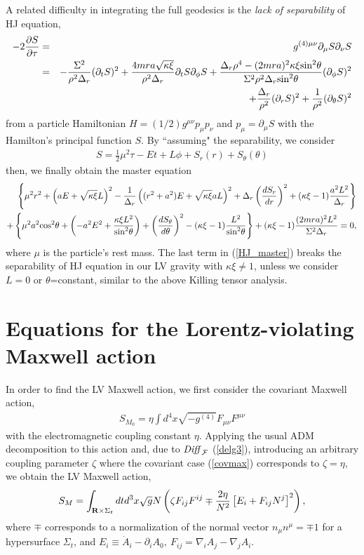 \documentclass[preprint,aps,tightenlines,showkeys,nofootinbib,superscriptaddress]{revtex4}
\newcommand{\beq}{\begin{eqnarray}}
\newcommand{\eeq}{\end{eqnarray}}
\newcommand{\De}{\Delta}
\newcommand{\ka}{\kappa}
\newcommand{\m}{{\mu}}
\newcommand{\n}{{\nu}}
\newcommand{\Si}{{\Sigma}}
\newcommand{\pa}{{\partial}}
\newcommand{\no}{{\nonumber}}
\newcommand{\f}{\frac}
\begin{document}
A related difficulty in integrating the full geodesics is the {\it lack of separability} of HJ equation,
\beq
-2 \f{\pa S}{\pa \tau}&=&g^{(4)\m \n} \pa_{\m}S \pa_{\n}S \no \\
&=&-\f{\Si^2}{\rho^2 \De_r}(\pa_t S)^2+\f{4  mra \sqrt{\ka \xi}}{\rho^2 \De_r}\pa_t S \pa_{\phi}S+\f{\De_r \rho^4 - (2mra)^2  \ka \xi \mbox{sin}^2\theta}{\Si^2 \rho^2 \De_r \mbox{sin}^2\theta}(\pa_{\phi}S)^2 \no \\
&&+\f{\De_r}{\rho^2}(\pa_r S)^2+\f{1}{\rho^2}(\pa_{\theta} S)^2
\label{HJ}
\eeq
from a particle Hamiltonian $H=(1/2)g^{\m\n}p_{\m} p_{\n}$ and $p_{\m}=\pa_{\m}S$ with the Hamilton's principal function $S$. By ``assuming" the separability, we consider \cite{Chan:1985}
\beq
S=\f{1}{2} \m^2 \tau -Et+L \phi+S_r (r)+S_{\theta} (\theta)
\eeq
then, we finally obtain the master equation
\beq
\left\{
\m^2 r^2 +\left(a E+\sqrt{\ka \xi} L \right)^2-\f{1}{\De_r} \left((r^2+a^2)E +\sqrt{\ka \xi} a L \right)^2+\De_r \left( \f{d S_r}{dr}\right)^2
+(\ka\xi-1) \f{a^2 L^2}{\De_r}
\right\} \no \\
+\left\{
\m^2 a^2 \mbox{cos}^2\theta+ \left(-a^2 E^2+\f{\ka \xi L^2}{\mbox{sin}^2\theta} \right)
+\left( \f{d S_{\theta}}{d\theta} \right)^2 -(\ka\xi-1) \f{L^2}{\mbox{sin}^2\theta}
\right\}
+(\ka\xi-1) \f{(2mra)^2 L^2}{\Si^2 \De_r}=0,\no \\
\label{HJ_master}
\eeq
where $\m$ is the particle's rest mass. The last term in (\ref{HJ_master}) breaks the separability of HJ equation in our LV gravity with $\ka \xi \neq 1$, unless we consider $L=0$ or $\theta$=constant, similar to the above Killing tensor analysis.

\section{Equations for the Lorentz-violating Maxwell action}

In order to find the LV Maxwell action, we first consider
the covariant Maxwell action,
\beq
S_{M_0}=\eta\int d^{4}x \sqrt{-g^{(4)}}  F_{\mu\nu}F^{\mu\nu}
\label{covmax}
\eeq
with the electromagnetic coupling constant $\eta$.
Applying the usual ADM decomposition to this action and, due to ${\it Diff}_{\cal F}$ (\ref{delg3}), introducing
an arbitrary coupling
 parameter $\zeta$ where the covariant case (\ref{covmax}) corresponds to $\zeta=\eta$, we obtain the LV Maxwell action,
\beq
S_{M}=\int_{{\bf R}\times \Si_t} dt d^{3}x \sqrt{g} N \left(\zeta F_{ij}F^{ij}\mp \frac{2\eta}{N^{2}}\left[E_{i}+F_{ij}N^{j}\right]^{2}\right),
\label{LV_Max-action}
\eeq
where $\mp$ corresponds to a normalization of the normal vector
$n_{\mu}n^{\mu}=\mp 1$ for a
hypersurface $\Si_t$,
and $E_{i}\equiv
\dot{A}_{i}-\partial_{i}A_{0},~ F_{ij}=\nabla_i A_j-\nabla_j A_i$.
\end{document}
